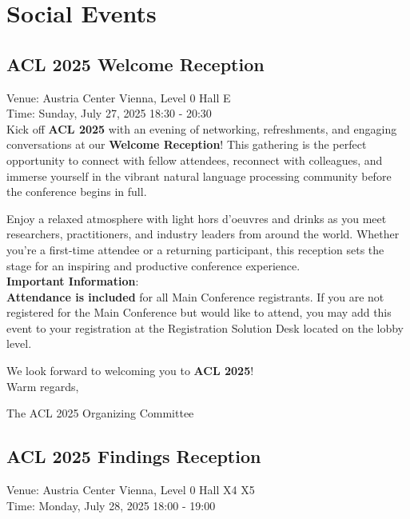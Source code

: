 \chapter{Social Events}

\section{ACL 2025 Welcome Reception}
\vspace*{0.2cm}

Venue: Austria Center Vienna, Level 0 Hall E\\
Time: Sunday, July 27, 2025 18:30 - 20:30\\

Kick off \textbf{ACL 2025} with an evening of networking, refreshments, and engaging conversations at our \textbf{Welcome Reception}! This gathering is the perfect opportunity to connect with fellow attendees, reconnect with colleagues, and immerse yourself in the vibrant natural language processing community before the conference begins in full.

Enjoy a relaxed atmosphere with light hors d’oeuvres and drinks as you meet researchers, practitioners, and industry leaders from around the world. Whether you're a first-time attendee or a returning participant, this reception sets the stage for an inspiring and productive conference experience.\\

\textbf{Important Information}:\\
\textbf{Attendance is included} for all Main Conference registrants.
If you are not registered for the Main Conference but would like to attend, you may add this event to your registration at the Registration Solution Desk located on the lobby level.

We look forward to welcoming you to \textbf{ACL 2025}!\\

Warm regards,

The ACL 2025 Organizing Committee

\clearpage

\section{ACL 2025 Findings Reception}
\vspace*{0.2cm}

Venue: Austria Center Vienna, Level 0 Hall X4 X5 \\
Time: Monday, July 28, 2025 18:00 - 19:00\\

